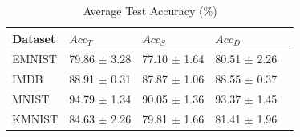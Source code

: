 \begin{table}
\caption{Average Test Accuracy (\%)}
\label{tab:test-acc}
\begin{tabular}{lllll}
\toprule
Dataset & $Acc_T$ & $Acc_S$ & $Acc_D$ \\
\midrule
EMNIST & 79.86 $\pm$ 3.28 & 77.10 $\pm$ 1.64 & 80.51 $\pm$ 2.26 \\
IMDB & 88.91 $\pm$ 0.31 & 87.87 $\pm$ 1.06 & 88.55 $\pm$ 0.37 \\
MNIST & 94.79 $\pm$ 1.34 & 90.05 $\pm$ 1.36 & 93.37 $\pm$ 1.45 \\
KMNIST & 84.63 $\pm$ 2.26 & 79.81 $\pm$ 1.66 & 81.41 $\pm$ 1.96 \\
\bottomrule
\end{tabular}
\end{table}
